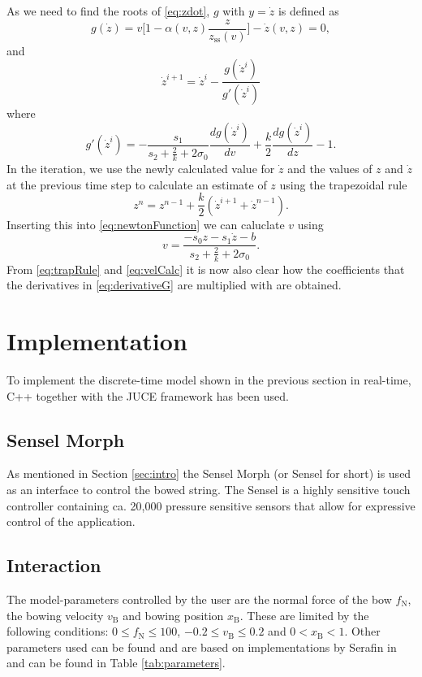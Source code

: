 \documentclass[twoside,a4paper]{article}
\begin{document}
As we need to find the roots of \eqref{eq:zdot}, $g$ with $y=\dot z$ is defined as
\begin{equation}
   g(\dot z) = v\bigg[1-\alpha(v, z)\frac{z}{z_\text{ss}(v)}\bigg] -  \dot z(v,z) = 0,
\end{equation}
and
\begin{equation}
    \dot z^{i+1} = \dot z^i - \frac{g(\dot z^i)}{g'(\dot z^i)}
\end{equation}
where
\begin{equation}\label{eq:derivativeG}
    g'(\dot z^i) = -\frac{s_1}{s_2+\frac{2}{k} + 2\sigma_0}\frac{dg(\dot z^i)}{dv} + \frac{k}{2}\frac{dg(\dot z^i)}{dz} - 1.
\end{equation}
In the iteration, we use the newly calculated value for $\dot z$ and the values of $z$ and $\dot z$ at the previous time step to calculate an estimate of $z$ using the trapezoidal rule
\begin{equation}\label{eq:trapRule}
    z^n = z^{n-1} + \frac{k}{2}(\dot z^{i+1} + \dot z^{n-1}).
\end{equation}
Inserting this into \eqref{eq:newtonFunction} we can caluclate $v$ using
\begin{equation}\label{eq:velCalc}
    v = \frac{-s_0z-s_1\dot z-b}{s_2 + \frac{2}{k} + 2\sigma_0}.
\end{equation}
From \eqref{eq:trapRule} and \eqref{eq:velCalc} it is now also clear how the coefficients that the derivatives in \eqref{eq:derivativeG} are multiplied with are obtained. 

\section{Implementation}\label{sec:implementation}
To implement the discrete-time model shown in the previous section in real-time, C++ together with the JUCE framework has been used. 
\subsection{Sensel Morph}
As mentioned in Section \ref{sec:intro} the Sensel Morph (or Sensel for short) is used as an interface to control the bowed string. The Sensel is a highly sensitive touch controller containing ca. 20,000 pressure sensitive sensors \cite{Sensel2019} that allow for expressive control of the application.  

\subsection{Interaction}
The model-parameters controlled by the user are the normal force of the bow $f_\text{N}$, the bowing velocity $v_\text{B}$ and bowing position $x_\text{B}$. These are limited by the following conditions: $0 \leq f_\text{N} \leq 100$, $-0.2 \leq v_\text{B} \leq 0.2$ and $0<x_\text{B}<1$. Other parameters used can be found 
and are based on implementations by Serafin in \cite{Serafin2004} and can be found in Table \ref{tab:parameters}.
    
\end{document}
